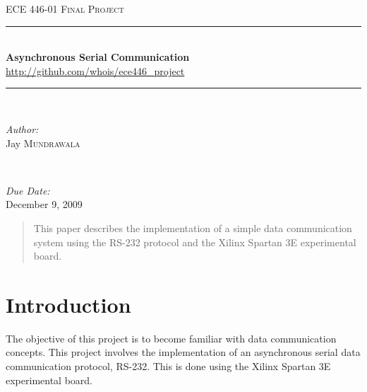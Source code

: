 \documentclass[12pt, a4paper]{article}
\newcommand{\HRule}{\rule{\linewidth}{0.5mm}}
\begin{document}
\begin{titlepage}

  \begin{center}
  \textsc{\Large ECE 446-01 Final Project}\\[0.5cm]


  \HRule \\[0.4cm]
  { \huge \bfseries Asynchronous Serial Communication}\\[0.4cm]
  \small \url{http://github.com/whois/ece446_project}
  \HRule \\[1.5cm]

\end{center}

  \begin{minipage}{0.4\textwidth}
    \begin{flushleft} \large
      \emph{Author:}\\
      Jay \textsc{Mundrawala}
    \end{flushleft}
  \end{minipage} \\[0.4cm]


  \vfill

  \begin{minipage}{0.9\textwidth}
    \begin{flushright} \large
      \emph{Due Date:} \\
      December 9, 2009      
    \end{flushright}
  \end{minipage}


\end{titlepage}
\tableofcontents
\newpage

\begin{abstract}
  This paper describes the implementation of a simple data communication system using the
  RS-232 protocol and the Xilinx Spartan 3E experimental board.
\end{abstract}
\section{Introduction}
The objective of this project is to become familiar with data communication concepts. This project
involves the implementation of an asynchronous serial data communication protocol, RS-232. This is
done using the Xilinx Spartan 3E experimental board.
\end{document}
